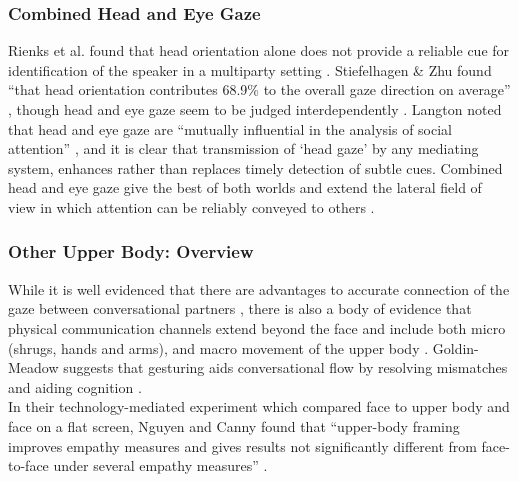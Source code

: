                 \subsubsection{Combined Head and Eye Gaze}
                    Rienks et al. found that head orientation alone does not provide a reliable cue for identification of the speaker in a multiparty setting \cite{Rienks2010}.
                    Stiefelhagen \& Zhu found ``that head orientation contributes 68.9\% to the overall gaze direction on average'' \cite{Stiefelhagen:2002:HOG:506443.506634}, though head and eye gaze seem to be judged interdependently \cite{Kluttz2009}.
                    Langton noted that head and eye gaze are ``mutually influential in the analysis of social attention'' \cite{Langton2000a}, and it is clear that transmission of `head gaze' by any mediating system, enhances rather than replaces timely detection of subtle cues. Combined head and eye gaze give the best of both worlds and extend the lateral field of view in which attention can be reliably conveyed to others \cite{Loomis2008}.
                \subsubsection{Other Upper Body: Overview}
                    While it is well evidenced that there are advantages to accurate connection of the gaze between conversational partners \cite{Argyle1969, Kleinke1986a}, there is also a body of evidence that physical communication channels extend beyond the face \cite{Kleinke1986a, Nguyen2009} and include both micro (shrugs, hands and arms), and macro movement of the upper body \cite{Ekman1993}. Goldin-Meadow suggests that gesturing aids conversational flow by resolving mismatches and aiding cognition \cite{Goldin-Meadow1999}.\\
                    In their technology-mediated experiment which compared face to upper body and face on a flat screen, Nguyen and Canny found that ``upper-body framing improves empathy measures and gives results not significantly different from face-to-face under several empathy measures'' \cite{Nguyen2009}. 
                    
